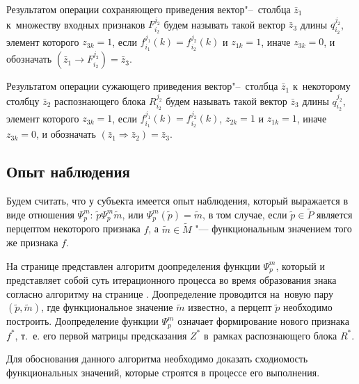 \begin{Def}
	Результатом операции сохраняющего приведения вектор"--~столбца $\bar z_1$ к~множеству входных признаков $F_{i_2}^{j_2}$ будем называть такой вектор $\bar z_3$ длины $q_{i_2}^{j_2}$, элемент которого $z_{3k}=1$, если $f_{i_1}^{j_1}(k)=f_{i_2}^{j_2}(k)$ и $z_{1k}=1$, иначе $z_{3k}=0$, и обозначать $(\bar z_1\rightarrow F_{i_2}^{j_2})=\bar z_3$.
\end{Def}

\begin{Def}
	Результатом операции сужающего приведения вектор"--~столбца $\bar z_1$ к~некоторому столбцу $\bar z_2$ распознающего блока $R_{i_2}^{j_2}$ будем называть такой вектор $\bar z_3$ длины $q_{i_2}^{j_2}$, элемент которого $z_{3k}=1$, если $f_{i_1}^{j_1}(k)=f_{i_2}^{j_2}(k)$, $z_{2k}=1$ и $z_{1k}=1$, иначе $z_{3k}=0$, и обозначать $(\bar z_1\Rightarrow \bar z_2)=\bar z_3$.
\end{Def}

\subsection{Опыт наблюдения}

Будем считать, что у субъекта имеется опыт наблюдения, который выражается в виде отношения $\Psi_p^m$: $\tilde p\Psi_p^m \tilde m$, или $\Psi_p^m(\tilde p)=\tilde m$, в том случае, если $\tilde p\in\tilde P$ является перцептом некоторого признака $f$, а $\tilde m\in\tilde M$ "--- функциональным значением того же признака $f$.

На странице \pageref{alg:cycle_pm} представлен алгоритм доопределения функции $\Psi_p^m$, который и представляет собой суть итерационного процесса во время образования знака согласно алгоритму на странице \pageref{new_sign_alg}. Доопределение проводится на~новую пару $(\tilde p,\tilde m)$, где функциональное значение $\tilde m$ известно, а перцепт $\tilde p$ необходимо построить. Доопределение функции $\Psi_p^m$ означает формирование нового признака $f^*$, т.~е. его первой матрицы предсказания $Z^*$ в~рамках распознающего блока $R^*$.

Для обоснования данного алгоритма необходимо доказать сходиомость функциональных значений, которые строятся в процессе его выполнения.

